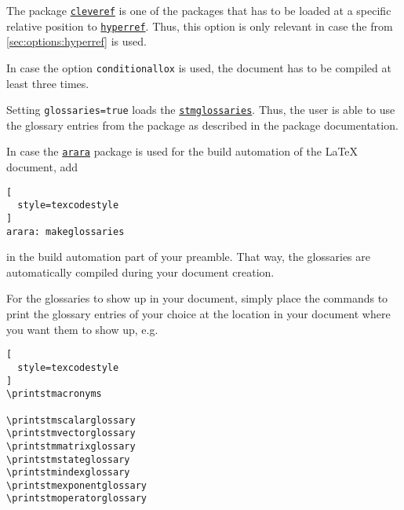 \documentclass[%
  type=article,%
  layout=koma,%
  page=false,%
  cleveref=true,%
  conditionallox=true,%
  conditionalloxnewpage=true,%
  date=true,%
  glossaries=true,%
  hyperref=true,%
  index=true,%
  listings=true%
]{stmtext}
\newcommand{\stmlatexpackagelink}[1]{\href{https://github.com/raedma/stmlatex/blob/master/doc/#1/#1.pdf}{\texttt{#1}}}
\newcommand{\ctanpackagelink}[1]{\href{https://ctan.org/pkg/#1}{\texttt{#1}}}
\begin{document}
\label{sec:options:cleveref}

The package \ctanpackagelink{cleveref} is one of the packages that has to be loaded at a specific relative position to \ctanpackagelink{hyperref}. Thus, this option is only relevant in case the  from \cref{sec:options:hyperref} is used.



In case the option \texttt{conditionallox} is used, the document has to be compiled at least three times.




Setting \texttt{glossaries=true} loads the \stmlatexpackagelink{stmglossaries}. Thus, the user is able to use the glossary entries from the package as described in the package documentation.

In case the \ctanpackagelink{arara} package is used for the build automation of the \LaTeX{} document, add
\begin{lstlisting}[
  style=texcodestyle
]
arara: makeglossaries
\end{lstlisting}

in the build automation part of your preamble. That way, the glossaries are automatically compiled during your document creation.

For the glossaries to show up in your document, simply place the commands to print the glossary entries of your choice at the location in your document where you want them to show up, e.g.

\begin{lstlisting}[
  style=texcodestyle
]
\printstmacronyms

\printstmscalarglossary
\printstmvectorglossary
\printstmmatrixglossary
\printstmstateglossary
\printstmindexglossary
\printstmexponentglossary
\printstmoperatorglossary
\end{lstlisting}
\end{document}
